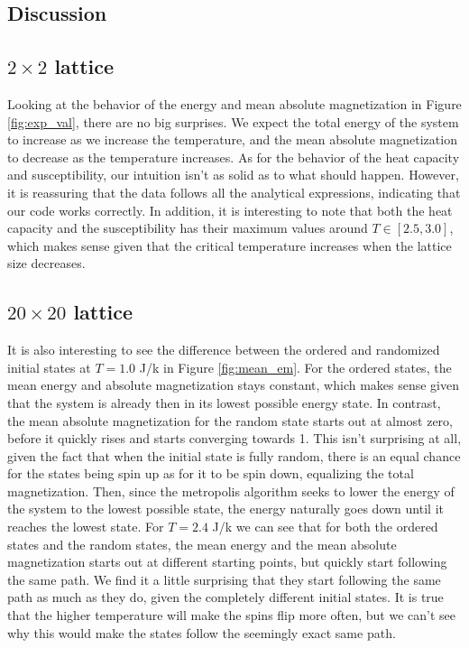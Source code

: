 \documentclass{article}
\begin{document}
\begin{multicols}{2}
\section{Discussion}

\subsection{$2\times 2$ lattice}

Looking at the behavior of the energy and mean absolute magnetization in Figure \ref{fig:exp_val}, there are no big surprises. We expect the total energy of the system to increase as we increase the temperature, and the mean absolute magnetization to decrease as the temperature increases. As for the behavior of the heat capacity and susceptibility, our intuition isn't as solid as to what should happen. However, it is reassuring that the data follows all the analytical expressions, indicating that our code works correctly. In addition, it is interesting to note that both the heat capacity and the susceptibility has their maximum values around $T\in[2.5, 3.0]$, which makes sense given that the critical temperature increases when the lattice size decreases.

\subsection{$20\times 20$ lattice}

It is also interesting to see the difference between the ordered and randomized initial states at $T=1.0$ J/k in Figure \ref{fig:mean_em}. For the ordered states, the mean energy and absolute magnetization stays constant, which makes sense given that the system is already then in its lowest possible energy state. In contrast, the mean absolute magnetization for the random state starts out at almost zero, before it quickly rises and starts converging towards 1. This isn't surprising at all, given the fact that when the initial state is fully random, there is an equal chance for the states being spin up as for it to be spin down, equalizing the total magnetization. Then, since the metropolis algorithm seeks to lower the energy of the system to the lowest possible state, the energy naturally goes down until it reaches the lowest state. For $T=2.4$ J/k we can see that for both the ordered states and the random states, the mean energy and the mean absolute magnetization starts out at different starting points, but quickly start following the same path. We find it a little surprising that they start following the same path as much as they do, given the completely different initial states. It is true that the higher temperature will make the spins flip more often, but we can't see why this would make the states follow the seemingly exact same path. 


\end{multicols}
\end{document}
